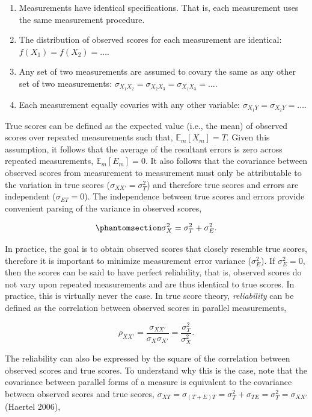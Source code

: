 \documentclass[
  letterpaper,
  DIV=11,
  numbers=noendperiod]{scrreprt}
\providecommand{\tightlist}{%
  \setlength{\itemsep}{0pt}\setlength{\parskip}{0pt}}\usepackage{longtable,booktabs,array}
\begin{document}
\begin{enumerate}
\def\labelenumi{\arabic{enumi}.}
\tightlist
\item
  Measurements have identical specifications. That is, each measurement
  uses the same measurement procedure.
\item
  The distribution of observed scores for each measurement are
  identical: \(f(X_1) = f(X_2) = \ldots\).
\item
  Any set of two measurements are assumed to covary the same as any
  other set of two measurements:
  \(\sigma_{X_1 X_2} = \sigma_{X_2 X_3} = \sigma_{X_1 X_3} = \ldots\).
\item
  Each measurement equally covaries with any other variable:
  \(\sigma_{X_1 Y} = \sigma_{X_2 Y} = \ldots\).
\end{enumerate}

True scores can be defined as the expected value (i.e., the mean) of
observed scores over repeated measurements such that,
\(\mathbb{E}_m[X_{m}]=T\). Given this assumption, it follows that the
average of the resultant errors is zero across repeated measurements,
\(\mathbb{E}_m[E_{m}]=0\). It also follows that the covariance between
observed scores from measurement to measurement must only be
attributable to the variation in true scores
(\(\sigma_{XX'}=\sigma^2_{T}\)) and therefore true scores and errors are
independent (\(\sigma_{ET}=0\)). The independence between true scores
and errors provide convenient parsing of the variance in observed
scores,

\begin{equation}\phantomsection\label{eq-variance}{
\sigma_{X}^2 = \sigma_T^2 + \sigma_{E}^2.
}\end{equation}

In practice, the goal is to obtain observed scores that closely resemble
true scores, therefore it is important to minimize measurement error
variance (\(\sigma^2_E\)). If \(\sigma^2_E = 0\), then the scores can be
said to have perfect reliability, that is, observed scores do not vary
upon repeated measurements and are thus identical to true scores. In
practice, this is virtually never the case. In true score theory,
\emph{reliability} can be defined as the correlation between observed
scores in parallel measurements,

\[
\rho_{XX'}=\frac{\sigma_{XX'}}{\sigma_X\sigma_{X'}}  = \frac{\sigma_T^2}{\sigma^2_X}.
\]

The reliability can also be expressed by the square of the correlation
between observed scores and true scores. To understand why this is the
case, note that the covariance between parallel forms of a measure is
equivalent to the covariance between observed scores and true scores,
\(\sigma_{XT}=\)\(\sigma_{(T+E)T}=\)\(\sigma^2_T + \sigma_{TE}=\)\(\sigma^2_T = \sigma_{XX'}\)
(Haertel 2006),
\end{document}
